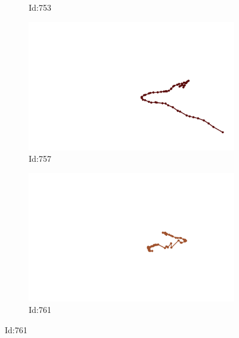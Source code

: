 \documentclass[12pt,twoside]{report}
\begin{document}
\begin{figure}
\begin{subfigure}[b]{0.20\textwidth}
\caption{Id:753}
\end{subfigure}
\begin{subfigure}[b]{0.20\textwidth}
\centering
\includegraphics[width=\textwidth]{../trajectories/757.png}
\caption{Id:757}
\end{subfigure}
\begin{subfigure}[b]{0.20\textwidth}
\centering
\includegraphics[width=\textwidth]{../trajectories/761.png}
\caption{Id:761}
\end{subfigure}
\end{figure}
\end{document}
